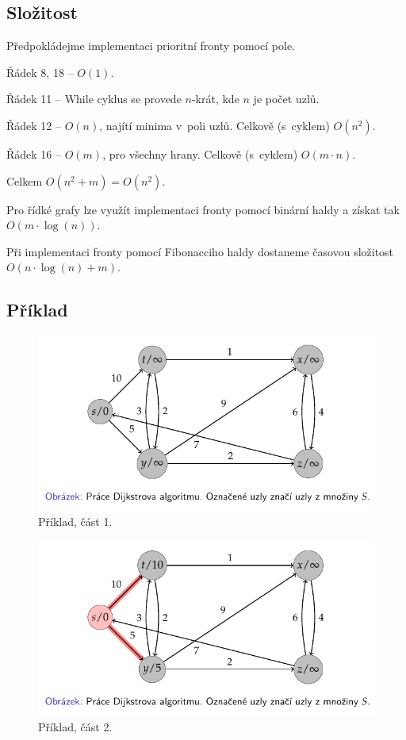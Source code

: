 \subsection*{Složitost}

\begin{compactitem}
    \item Předpokládejme implementaci prioritní fronty pomocí pole.
    \item Řádek 8, 18 -- $O(1)$.
    \item Řádek 11 -- While cyklus se provede $n$-krát, kde $n$ je počet uzlů.
    \item Řádek 12 -- $O(n)$, najítí minima v~poli uzlů. Celkově (s~cyklem) $O(n^2)$.
    \item Řádek 16 -- $O(m)$, pro všechny hrany. Celkově (s~cyklem) $O(m \cdot n)$.
    \item Celkem $O(n^2 + m) = O(n^2)$.
    \item Pro řídké grafy lze využít implementaci fronty pomocí binární haldy a získat tak $O(m \cdot \log(n))$.
    \item Při implementaci fronty pomocí Fibonacciho haldy dostaneme časovou složitost $O(n \cdot \log(n) + m)$.
\end{compactitem}

\subsection*{Příklad}

\begin{figure}[H]
    \centering
    \includegraphics[width=0.80\linewidth]{example_dijkstra_p1.pdf}
    \caption{Příklad, část 1.}
\end{figure}

\begin{figure}[H]
    \centering
    \includegraphics[width=0.80\linewidth]{example_dijkstra_p2.pdf}
    \caption{Příklad, část 2.}
\end{figure}

